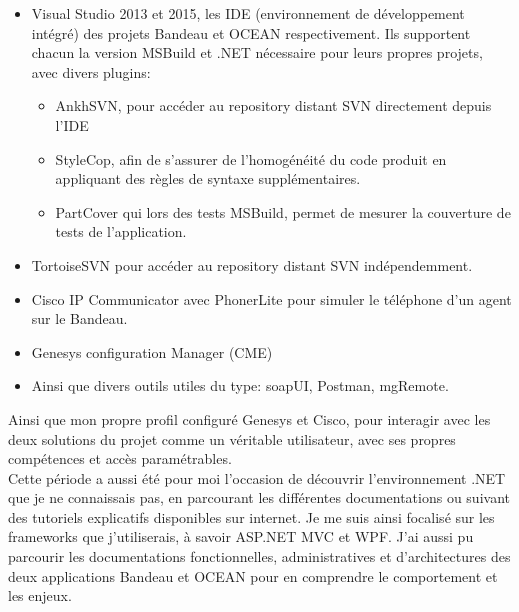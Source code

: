 \documentclass{rapport}
\begin{document}
\begin{itemize}
  \item Visual Studio 2013 et 2015, les IDE (environnement de développement intégré) des projets Bandeau et OCEAN respectivement. Ils supportent chacun la version MSBuild et .NET nécessaire pour leurs propres projets, avec divers plugins:
  
    \begin{itemize}
        \item AnkhSVN, pour accéder au repository distant SVN directement depuis l'IDE
  
        \item StyleCop, afin de s'assurer de l'homogénéité du code produit en appliquant des règles de syntaxe supplémentaires.
  
        \item PartCover qui lors des tests MSBuild, permet de mesurer la couverture de tests de l'application.
    \end{itemize}

  \item TortoiseSVN pour accéder au repository distant SVN indépendemment.
  
  \item Cisco IP Communicator avec PhonerLite pour simuler le téléphone d'un agent sur le Bandeau.
  
  \item Genesys configuration Manager (CME)
  
  \item Ainsi que divers outils utiles du type: soapUI, Postman, mgRemote.
  
\end{itemize}

Ainsi que mon propre profil configuré Genesys et Cisco, pour interagir avec les deux solutions du projet comme un véritable utilisateur, avec ses propres compétences et accès paramétrables.\\

Cette période a aussi été pour moi l'occasion de découvrir l'environnement .NET que je ne connaissais pas, en parcourant les différentes documentations ou suivant des tutoriels explicatifs disponibles sur internet. Je me suis ainsi focalisé sur les frameworks que j'utiliserais, à savoir ASP.NET MVC et WPF. J'ai aussi pu parcourir les documentations fonctionnelles, administratives et d'architectures des deux applications Bandeau et OCEAN pour en comprendre le comportement et les enjeux.\\
\end{document}
